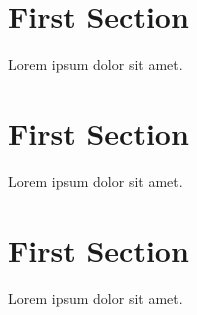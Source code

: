 



\section*{First Section}
Lorem ipsum dolor sit amet.

\section*{First Section}
Lorem ipsum dolor sit amet.

\section*{First Section}
Lorem ipsum dolor sit amet.


